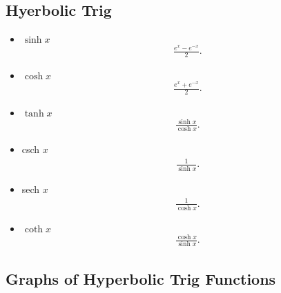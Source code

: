 \documentclass{report}
\begin{document}
     \bigbreak \noindent \bigbreak \noindent 
     \subsection{Hyerbolic Trig}
    \begin{itemize}
      \item $\sinh{x}$
        \begin{align*}
          \frac{e^{x}-e^{-x}}{2}
        .\end{align*}
      \item $\cosh{x}$
        \begin{align*}
          \frac{e^{x}+e^{-x}}{2}
        .\end{align*}
      \item $ \tanh{x} $
        \begin{align*}
          \frac{\sinh{x}}{\cosh{x}}
        .\end{align*}
      \item csch $x$
        \begin{align*}
          \frac{1}{\sinh{x}}
        .\end{align*}
      \item sech $x$
        \begin{align*}
          \frac{1}{\cosh{x}}
        .\end{align*}
      \item $\coth{x}$
        \begin{align*}
          \frac{\cosh{x}}{\sinh{x}}
        .\end{align*}
    \end{itemize}

    \pagebreak \bigbreak \noindent
    \subsection{Graphs of Hyperbolic Trig Functions}
    \bigbreak \noindent \bigbreak \noindent
    \begin{figure}[ht]
        \centering
        \label{fig:sinhx}
    \end{figure}
    \begin{figure}[ht]
        \centering
        \label{fig:tanhx}
    \end{figure}
    \begin{figure}[h]
        \centering
        \label{fig:csch}
    \end{figure}
\end{document}
